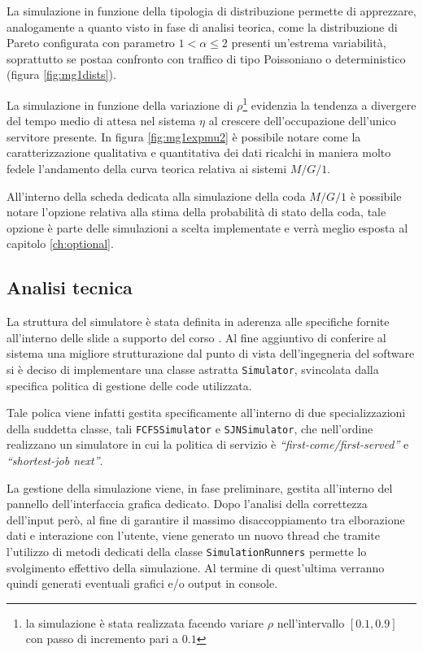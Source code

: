 La simulazione in funzione della tipologia di distribuzione permette di apprezzare, analogamente a quanto visto in fase di analisi teorica, come la distribuzione di Pareto configurata con parametro $1<\alpha\le2$ presenti un'estrema variabilit\`a, soprattutto se postaa confronto con traffico di tipo Poissoniano o deterministico (figura \ref{fig:mg1dists}).

La simulazione in funzione della variazione di $\rho$\footnote{la simulazione \`e stata realizzata facendo variare $\rho$ nell'intervallo $[0.1, 0.9]$ con passo di incremento pari a $0.1$} evidenzia la tendenza a divergere del tempo medio di attesa nel sistema $\eta$ al crescere dell'occupazione dell'unico servitore presente. In figura \ref{fig:mg1expmu2} \`e possibile notare come la caratterizzazione qualitativa e quantitativa dei dati ricalchi in maniera molto fedele l'andamento della curva teorica relativa ai sistemi $M/G/1$.

All'interno della scheda dedicata alla simulazione della coda $M/G/1$ \`e possibile notare l'opzione relativa alla stima della probabilit\`a di stato della coda, tale opzione \`e parte delle simulazioni a scelta implementate e verr\`a meglio esposta al capitolo \ref{ch:optional}.


\subsection{Analisi tecnica}

La struttura del simulatore \`e stata definita in aderenza alle specifiche fornite all'interno delle slide a supporto del corso \cite{cerroni01}. 
Al fine aggiuntivo di conferire al sistema una migliore strutturazione dal punto di vista dell'ingegneria del software si \`e deciso di implementare una classe astratta {\tt Simulator}, svincolata dalla specifica politica di gestione delle code utilizzata. 

Tale polica viene infatti gestita specificamente all'interno di due specializzazioni della suddetta classe, tali {\tt FCFSSimulator} e {\tt SJNSimulator}, che nell'ordine realizzano un simulatore in cui la politica di servizio \`e \emph{``first-come/first-served''} e \emph{``shortest-job next''}.

La gestione della simulazione viene, in fase preliminare, gestita all'interno del pannello dell'interfaccia grafica dedicato. Dopo l'analisi della correttezza dell'input per\`o, al fine di garantire il massimo disaccoppiamento tra elborazione dati e interazione con l'utente, viene generato un nuovo thread che tramite l'utilizzo di metodi dedicati della classe {\tt SimulationRunners} permette lo svolgimento effettivo della simulazione. Al termine di quest'ultima verranno quindi generati eventuali grafici e/o output in console.

